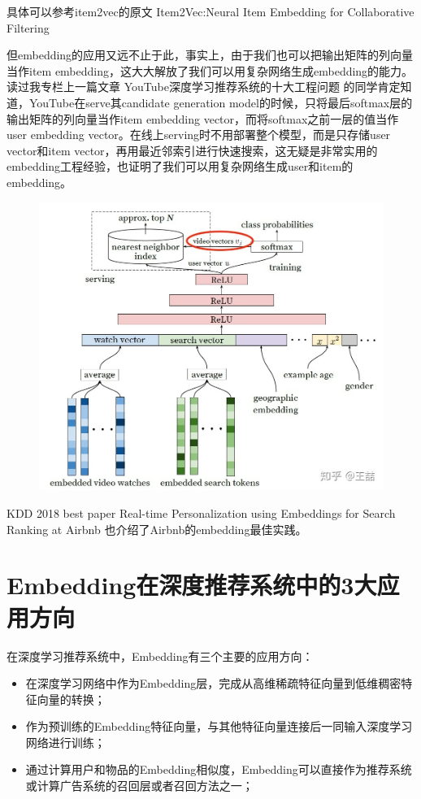 \documentclass[12pt]{article}
\begin{document}
具体可以参考item2vec的原文 Item2Vec:Neural Item Embedding for Collaborative Filtering

但embedding的应用又远不止于此，事实上，由于我们也可以把输出矩阵的列向量当作item embedding，这大大解放了我们可以用复杂网络生成embedding的能力。读过我专栏上一篇文章 YouTube深度学习推荐系统的十大工程问题 的同学肯定知道，YouTube在serve其candidate generation model的时候，只将最后softmax层的输出矩阵的列向量当作item embedding vector，而将softmax之前一层的值当作user embedding vector。在线上serving时不用部署整个模型，而是只存储user vector和item vector，再用最近邻索引进行快速搜索，这无疑是非常实用的embedding工程经验，也证明了我们可以用复杂网络生成user和item的embedding。

\begin{figure}[H]
    \centering
    \includegraphics[width=.8\textwidth]{fig/Embedding_In_Youtube_2.jpg}
\end{figure}

KDD 2018 best paper Real-time Personalization using Embeddings for Search Ranking at Airbnb 也介绍了Airbnb的embedding最佳实践。

\section{Embedding在深度推荐系统中的3大应用方向
\cite{Three_Application_Of_Embedding_In_Reference_System}}

在深度学习推荐系统中，Embedding有三个主要的应用方向：
\begin{itemize}
\setlength{\itemsep}{0pt}
\setlength{\parsep}{0pt}
\setlength{\parskip}{0pt}
    \item 在深度学习网络中作为Embedding层，完成从高维稀疏特征向量到低维稠密特征向量的转换；
    \item 作为预训练的Embedding特征向量，与其他特征向量连接后一同输入深度学习网络进行训练；
    \item 通过计算用户和物品的Embedding相似度，Embedding可以直接作为推荐系统或计算广告系统的召回层或者召回方法之一；
\end{itemize}
\end{document}
